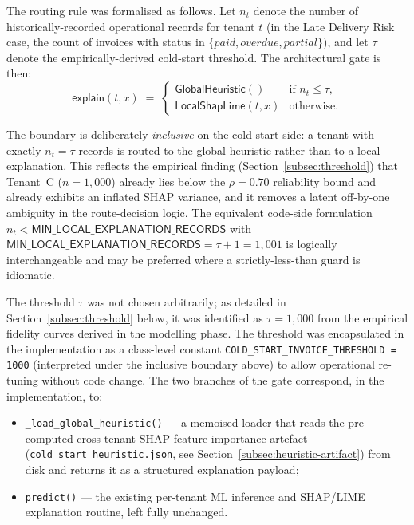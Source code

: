 The routing rule was formalised as follows. Let $n_t$ denote the number of
historically-recorded operational records for tenant $t$ (in the Late
Delivery Risk case, the count of invoices with status in $\{\textit{paid},
\textit{overdue}, \textit{partial}\}$), and let $\tau$ denote the
empirically-derived cold-start threshold. The architectural gate is then:
\begin{equation}
\textsf{explain}(t, x) \;=\;
\begin{cases}
    \textsf{GlobalHeuristic}() & \text{if } n_t \le \tau, \\
    \textsf{LocalShapLime}(t, x) & \text{otherwise.}
\end{cases}
\label{eq:routing}
\end{equation}

The boundary is deliberately \emph{inclusive} on the cold-start side: a
tenant with exactly $n_t = \tau$ records is routed to the global heuristic
rather than to a local explanation. This reflects the empirical finding
(Section~\ref{subsec:threshold}) that Tenant~C ($n = 1{,}000$) already lies
below the $\rho = 0.70$ reliability bound and already exhibits an inflated
SHAP variance, and it removes a latent off-by-one ambiguity in the
route-decision logic. The equivalent code-side formulation
$n_t < \textsf{MIN\_LOCAL\_EXPLANATION\_RECORDS}$ with
$\textsf{MIN\_LOCAL\_EXPLANATION\_RECORDS} = \tau + 1 = 1{,}001$ is
logically interchangeable and may be preferred where a strictly-less-than
guard is idiomatic.

The threshold $\tau$ was not chosen arbitrarily; as detailed in
Section~\ref{subsec:threshold} below, it was identified as $\tau = 1{,}000$
from the empirical fidelity curves derived in the modelling phase. The
threshold was encapsulated in the implementation as a class-level constant
\texttt{COLD\_START\_INVOICE\_THRESHOLD = 1000} (interpreted under the
inclusive boundary above) to allow operational re-tuning without code
change. The two branches of the gate correspond, in
the implementation, to:

\begin{itemize}
    \item \texttt{\_load\_global\_heuristic()} --- a memoised loader that
    reads the pre-computed cross-tenant SHAP feature-importance artefact
    (\texttt{cold\_start\_heuristic.json}, see
    Section~\ref{subsec:heuristic-artifact}) from disk and returns it as a
    structured explanation payload;
    \item \texttt{predict()} --- the existing per-tenant ML inference and
    SHAP/LIME explanation routine, left fully unchanged.
\end{itemize}

